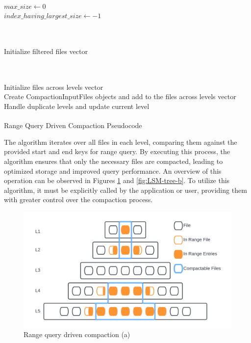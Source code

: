 \documentclass[balance=false, sigconf]{acmart}
\begin{document}
\begin{algorithm}
     \\
    $max\_size \gets 0$ \\
    $index\_having\_largest\_size \gets -1$ \\
     \\
    \BlankLine
    
     \\
    Initialize filtered files vector \\
     \\
    \BlankLine
    
     \\
    Initialize files across levels vector \\
    Create CompactionInputFiles objects and add to the files across levels vector \\
    Handle duplicate levels and update current level \\
     \\
    \caption{Range Query Driven Compaction Pseudocode}
\end{algorithm}

The algorithm\cite{rocksdbgithub} iterates over all files in each level, comparing them against the provided start and end keys for range query. By executing this process, 
the algorithm ensures that only the necessary files are compacted, leading to optimized storage and improved query performance. An overview of this operation can be observed in Figures \ref{fig:LSM-tree-a} and \ref{fig:LSM-tree-b}. To utilize this algorithm, 
it must be explicitly called by the application or user, providing them with greater control over the compaction process.

\begin{figure}
  \centering
  \includegraphics[scale=0.12]{Figures/LSM1.png}
  \caption{Range query driven compaction (a)}
  \label{fig:LSM-tree-a}
\end{figure}
\end{document}
